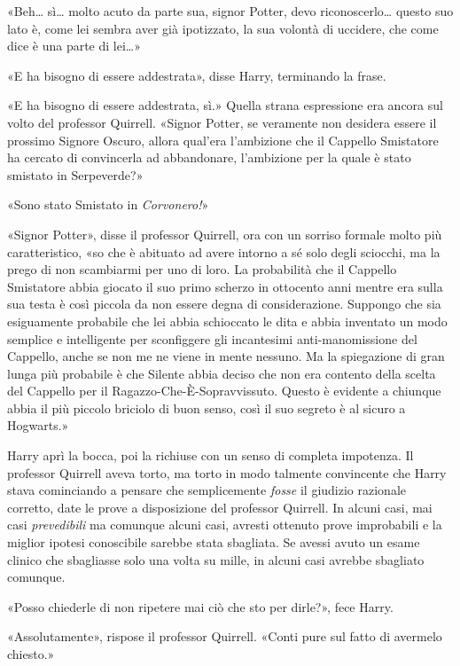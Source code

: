 «Beh… sì… molto acuto da parte sua, signor Potter, devo riconoscerlo… questo suo lato è, come lei sembra aver già ipotizzato, la sua volontà di uccidere, che come dice è una parte di lei…»

«E ha bisogno di essere addestrata», disse Harry, terminando la frase.

«E ha bisogno di essere addestrata, sì.» Quella strana espressione era ancora sul volto del professor Quirrell. «Signor Potter, se veramente non desidera essere il prossimo Signore Oscuro, allora qual’era l’ambizione che il Cappello Smistatore ha cercato di convincerla ad abbandonare, l’ambizione per la quale è stato smistato in Serpeverde?»

«Sono stato Smistato in \textit{Corvonero!}»

«Signor Potter», disse il professor Quirrell, ora con un sorriso formale molto più caratteristico, «so che è abituato ad avere intorno a sé solo degli sciocchi, ma la prego di non scambiarmi per uno di loro. La probabilità che il Cappello Smistatore abbia giocato il suo primo scherzo in ottocento anni mentre era sulla sua testa è così piccola da non essere degna di considerazione. Suppongo che sia esiguamente probabile che lei abbia schioccato le dita e abbia inventato un modo semplice e intelligente per sconfiggere gli incantesimi anti-manomissione del Cappello, anche se non me ne viene in mente nessuno. Ma la spiegazione di gran lunga più probabile è che Silente abbia deciso che non era contento della scelta del Cappello per il Ragazzo-Che-È-Sopravvissuto. Questo è evidente a chiunque abbia il più piccolo briciolo di buon senso, così il suo segreto è al sicuro a Hogwarts.»

Harry aprì la bocca, poi la richiuse con un senso di completa impotenza. Il professor Quirrell aveva torto, ma torto in modo talmente convincente che Harry stava cominciando a pensare che semplicemente \textit{fosse} il giudizio razionale corretto, date le prove a disposizione del professor Quirrell. In alcuni casi, mai casi \textit{prevedibili} ma comunque alcuni casi, avresti ottenuto prove improbabili e la miglior ipotesi conoscibile sarebbe stata sbagliata. Se avessi avuto un esame clinico che sbagliasse solo una volta su mille, in alcuni casi avrebbe sbagliato comunque.

«Posso chiederle di non ripetere mai ciò che sto per dirle?», fece Harry.

«Assolutamente», rispose il professor Quirrell. «Conti pure sul fatto di avermelo chiesto.»

